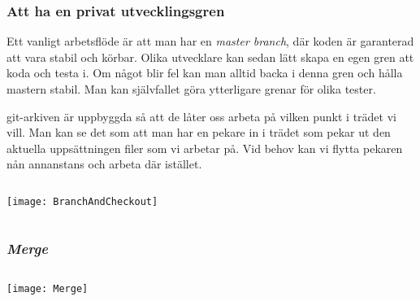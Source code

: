 \documentclass[swedish]{beamer}
\newenvironment{dialogue}{%
\VerbatimEnvironment
\begin{Verbatim}[fontsize=\footnotesize,commandchars=\#\(\)]%
}
{%
\end{Verbatim}
}
\begin{document}
\begin{frame}[fragile]
\frametitle{Att ha en privat utvecklingsgren}
Ett vanligt arbetsflöde är att man har en \emph{master branch}, där koden är garanterad att vara stabil och körbar.  Olika utvecklare kan sedan lätt skapa en egen gren att koda och testa i.  Om något blir fel kan man alltid backa i denna gren och hålla mastern stabil.  Man kan självfallet göra ytterligare grenar för olika tester.

git-arkiven är uppbyggda så att de låter oss arbeta på vilken punkt i trädet vi vill.  Man kan se det som att man har en pekare in i trädet som pekar ut den aktuella uppsättningen filer som vi arbetar på.  Vid behov kan vi flytta pekaren nån annanstans och arbeta där istället.
\end{frame}

\begin{frame}[fragile]
  \begin{columns}
    \begin{column}{0.5\textwidth}

\vspace{\baselineskip}

\texttt{[image: BranchAndCheckout]}
    \end{column}
  \end{columns}
  
\end{frame}

\begin{frame}[fragile]
\frametitle{\emph{Merge}}
\begin{columns}
\begin{column}{0.5\textwidth}

\vspace{\baselineskip}

\texttt{[image: Merge]}

\end{column}
\end{columns}
\end{frame}
\end{document}
